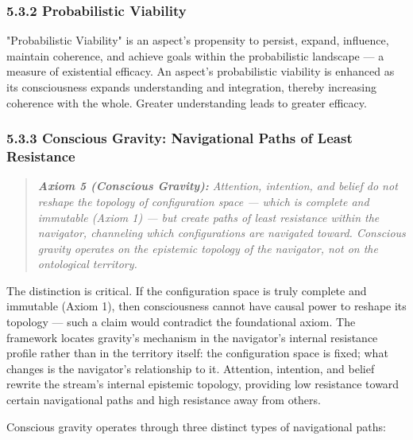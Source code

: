 \subsubsection*{5.3.2 Probabilistic Viability}


"Probabilistic Viability" is an aspect's propensity to persist, expand, influence, maintain coherence, and achieve goals within the probabilistic landscape — a measure of existential efficacy. An aspect's probabilistic viability is enhanced as its consciousness expands understanding and integration, thereby increasing coherence with the whole. Greater understanding leads to greater efficacy.


\subsubsection*{5.3.3 Conscious Gravity: Navigational Paths of Least Resistance}


\begin{quote}
\itshape
\textbf{Axiom 5 (Conscious Gravity):} \textit{Attention, intention, and belief do not reshape the topology of configuration space — which is complete and immutable (Axiom 1) — but create paths of least resistance within the navigator, channeling which configurations are navigated toward. Conscious gravity operates on the epistemic topology of the navigator, not on the ontological territory.}
\end{quote}


The distinction is critical. If the configuration space is truly complete and immutable (Axiom 1), then consciousness cannot have causal power to reshape its topology — such a claim would contradict the foundational axiom. The framework locates gravity's mechanism in the navigator's internal resistance profile rather than in the territory itself: the configuration space is fixed; what changes is the navigator's relationship to it. Attention, intention, and belief rewrite the stream's internal epistemic topology, providing low resistance toward certain navigational paths and high resistance away from others.


Conscious gravity operates through three distinct types of navigational paths:


